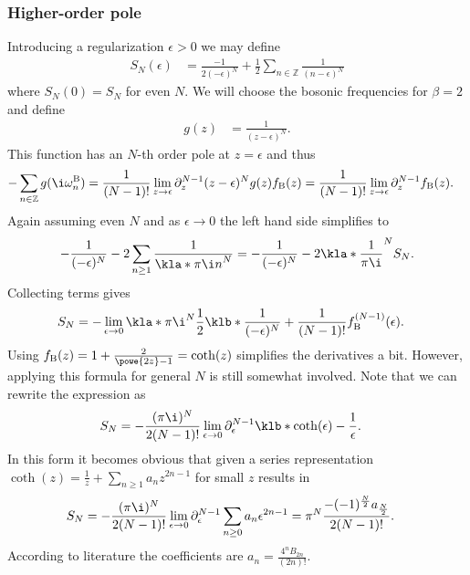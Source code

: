 \documentclass[english, parskip=full]{scrartcl}
\begin{document}
\subsubsection{Higher-order pole}
Introducing a regularization $\epsilon > 0$ we may define
\begin{align}
S_N(\epsilon) &= \frac{-1}{2(-\epsilon)^N} + \frac{1}{2}\sum_{n\in\mathbb{Z}} \frac{1}{(n - \epsilon)^N}
\end{align}
where $S_N(0) = S_N$ for even $N$.
We will choose the bosonic frequencies for $\beta = 2$ and define
\begin{align}
g(z) &= \frac{1}{(z - \epsilon)^N}.
\end{align}
This function has an $N$-th order pole at $z=\epsilon$ and thus
\begin{align}
-\sum_{n\in\mathbb{Z}} g(\i\omega_n^\text{B}) &= \frac{1}{(N-1)!} \lim_{z\rightarrow \epsilon} \partial_z^{N-1} (z-\epsilon)^N g(z) f_\text{B}(z) = \frac{1}{(N-1)!} \lim_{z\rightarrow \epsilon} \partial_z^{N-1} f_\text{B}(z).
\end{align}
Again assuming even $N$ and as $\epsilon\rightarrow 0$ the left hand side simplifies to
\begin{align}
- \frac{1}{(-\epsilon)^N} - 2 \sum_{n\ge 1} \frac{1}{\kla*{\pi\i n}^N} = -\frac{1}{(-\epsilon)^N} - 2\kla*{\frac{1}{\pi\i}}^N S_N.
\end{align}
Collecting terms gives
\begin{align}
S_N &= -\lim_{\epsilon \rightarrow 0} \kla*{\pi\i}^N \frac{1}{2} \klb*{ \frac{1}{(-\epsilon)^N} +  \frac{1}{(N-1)!} f_\text{B}^{(N-1)}(\epsilon)  }.
\end{align}
Using $f_\text{B}(z) = 1 + \frac{2}{\powe{2 z} - 1} = \coth(z)$ simplifies the derivatives a bit.
However, applying this formula for general $N$ is still somewhat involved.
Note that we can rewrite the expression as
\begin{align}
S_N &= -\frac{(\pi\i)^N}{2(N-1)!} \lim_{\epsilon \rightarrow 0} \partial_\epsilon^{N-1} \klb*{ \coth(\epsilon) - \frac{1}{\epsilon} }.
\end{align}
In this form it becomes obvious that given a series representation $\coth(z) = \frac{1}{z} + \sum_{n\ge 1} a_n z^{2n-1}$ for small $z$ results in
\begin{align}
S_N &= -\frac{(\pi\i)^N}{2(N-1)!} \lim_{\epsilon \rightarrow 0} \partial_\epsilon^{N-1} \sum_{n\ge 0} a_n \epsilon^{2n-1} = \pi^N \frac{-(-1)^\frac{N}{2} a_{\frac{N}{2}}}{2(N-1)!}.
\end{align}
According to literature the coefficients are $a_n = \frac{4^n B_{2n}}{(2n)!}$.\\
\end{document}
